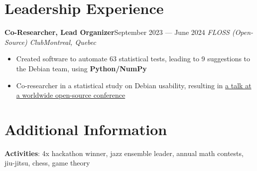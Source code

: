 \documentclass{article}
\newcommand{\newrole}[4]{
    {\normalfont\textbf{#1}\hfill#3}
    \newline
    \textit{#2}\hfill\textit{#4}
}
\newenvironment{bulletpoints}{\begin{itemize}\setlength\itemsep{-0.2em}}{\end{itemize}}
\begin{document}
\section*{Leadership Experience}
\newrole{Co-Researcher, Lead Organizer}{FLOSS (Open-Source) Club}{September 2023 --- June 2024}{Montreal, Quebec}
\begin{bulletpoints}
    \item Created software to automate 63 statistical tests, leading to 9 suggestions to the Debian team, using \textbf{Python/NumPy}
    \item Co-researcher in a statistical study on Debian usability, resulting in \href{https://debconf24.debconf.org/talks/49-debian-installer-usability-tests-take-2/}{a talk at a worldwide open-source conference\;\faExternalLink}
\end{bulletpoints}


\section*{Additional Information}
{\bfseries Activities}: 4x hackathon winner, jazz ensemble leader, annual math contests, jiu-jitsu, chess, game theory
\end{document}
